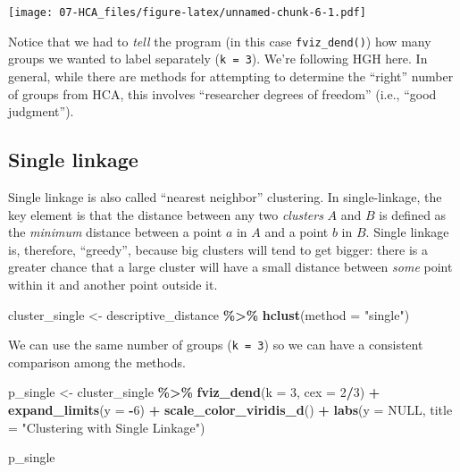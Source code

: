 \documentclass[
]{book}
\newenvironment{Shaded}{\begin{snugshade}}{\end{snugshade}}
\newcommand{\AttributeTok}[1]{\textcolor[rgb]{0.13,0.29,0.53}{#1}}
\newcommand{\ConstantTok}[1]{\textcolor[rgb]{0.56,0.35,0.01}{#1}}
\newcommand{\DecValTok}[1]{\textcolor[rgb]{0.00,0.00,0.81}{#1}}
\newcommand{\FunctionTok}[1]{\textcolor[rgb]{0.13,0.29,0.53}{\textbf{#1}}}
\newcommand{\NormalTok}[1]{#1}
\newcommand{\OtherTok}[1]{\textcolor[rgb]{0.56,0.35,0.01}{#1}}
\newcommand{\SpecialCharTok}[1]{\textcolor[rgb]{0.81,0.36,0.00}{\textbf{#1}}}
\newcommand{\StringTok}[1]{\textcolor[rgb]{0.31,0.60,0.02}{#1}}
\begin{document}
\texttt{[image: 07-HCA\_files/figure-latex/unnamed-chunk-6-1.pdf]}

Notice that we had to \emph{tell} the program (in this case \texttt{fviz\_dend()}) how many groups we wanted to label separately (\texttt{k\ =\ 3}). We're following HGH here. In general, while there are methods for attempting to determine the ``right'' number of groups from HCA, this involves ``researcher degrees of freedom'' (i.e., ``good judgment'').

\subsection{Single linkage}\label{single-linkage}

Single linkage is also called ``nearest neighbor'' clustering. In single-linkage, the key element is that the distance between any two \emph{clusters} \(A\) and \(B\) is defined as the \emph{minimum} distance between a point \(a\) in \(A\) and a point \(b\) in \(B\). Single linkage is, therefore, ``greedy'', because big clusters will tend to get bigger: there is a greater chance that a large cluster will have a small distance between \emph{some} point within it and another point outside it.

\begin{Shaded}
\begin{Highlighting}[]
\NormalTok{cluster\_single }\OtherTok{\textless{}{-}} 
\NormalTok{  descriptive\_distance }\SpecialCharTok{\%\textgreater{}\%}
  \FunctionTok{hclust}\NormalTok{(}\AttributeTok{method =} \StringTok{"single"}\NormalTok{)}
\end{Highlighting}
\end{Shaded}

We can use the same number of groups (\texttt{k\ =\ 3}) so we can have a consistent comparison among the methods.

\begin{Shaded}
\begin{Highlighting}[]
\NormalTok{p\_single }\OtherTok{\textless{}{-}} 
\NormalTok{  cluster\_single }\SpecialCharTok{\%\textgreater{}\%}
  \FunctionTok{fviz\_dend}\NormalTok{(}\AttributeTok{k =} \DecValTok{3}\NormalTok{, }\AttributeTok{cex =} \DecValTok{2}\SpecialCharTok{/}\DecValTok{3}\NormalTok{) }\SpecialCharTok{+} 
  \FunctionTok{expand\_limits}\NormalTok{(}\AttributeTok{y =} \SpecialCharTok{{-}}\DecValTok{6}\NormalTok{) }\SpecialCharTok{+} 
  \FunctionTok{scale\_color\_viridis\_d}\NormalTok{() }\SpecialCharTok{+}
  \FunctionTok{labs}\NormalTok{(}\AttributeTok{y =} \ConstantTok{NULL}\NormalTok{, }\AttributeTok{title =} \StringTok{"Clustering with Single Linkage"}\NormalTok{)}

\NormalTok{p\_single}
\end{Highlighting}
\end{Shaded}
\end{document}
